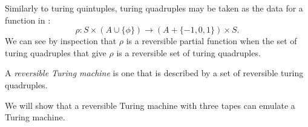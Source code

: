 Similarly to turing quintuples, turing quadruples may be taken as the
data for a function in \sets:
\[\rho:S\times(A  \cup \{\phi\}) \to (A  + \{-1,0,1\}) \times S.\]
We can see by inspection that $\rho$ is a reversible partial function when
the set of turing quadruples that give $\rho$ is a reversible set of turing
quadruples.

\begin{definition}\label{def:reversible_turing_machine}
  A \emph{reversible Turing machine} is one that is described by a
  set of reversible turing quadruples.
\end{definition}

We will show that a reversible Turing machine with three tapes can emulate
a Turing machine.








